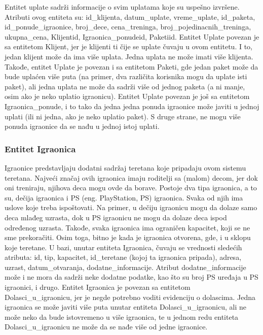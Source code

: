 \documentclass[../main.tex]{subfiles}
\begin{document}
Entitet uplate sadrži informacije o svim uplatama koje su uspešno izvršene. Atributi ovog entiteta su: id\_klijenta, datum\_uplate, vreme\_uplate, id\_paketa, id\_ponude\_igraonice, broj\_dece, cena\_treninga, broj\_pojedinacnih\_treninga, ukupna\_cena, Klijentid, Igraonica\_ponudeid, Paketiid.
Entitet Uplate povezan je sa entitetom Klijent, jer je klijenti ti čije se uplate čuvaju u ovom entitetu. I to, jedan klijent može da ima više uplata. Jedna uplata ne može imati više klijenta. Takođe, entitet Uplate je povezan i sa entitetom Paketi, gde jedan paket može da bude uplaćen više puta (na primer, dva različita korisnika mogu da uplate isti paket), ali jedna uplata ne može da sadrži više od jednog paketa (a ni manje, osim ako je neko uplatio igraonicu). Entitet Uplate povezan je još sa entitetom Igraonica\_ponude, i to tako da jedna jedna ponuda igraonice može javiti u jednoj uplati (ili ni jedna, ako je neko uplatio paket). S druge strane, ne mogu više ponuda igraonice da se nađu u jednoj istoj uplati.


\subsubsection{Entitet Igraonica}
Igraonice predstavljaju dodatni sadržaj teretana koje pripadaju ovom sistemu teretana. Najveći značaj ovih igraonica imaju roditelji sa (malom) decom, jer dok oni treniraju, njihova deca mogu ovde da borave. Postoje dva tipa igraonica, a to su, dečija igraonica i PS (eng. PlayStation, PS) igraonica. Svaka od njih ima uslove koje treba ispoštovati. Na primer, u dečiju igraonicu mogu da dolaze samo deca mlađeg uzrasta, dok u PS igraonicu ne mogu da dolaze deca ispod određenog uzrasta. Takođe, svaka igraonica ima ograničen kapacitet, koji se ne sme prekoračiti. Osim toga, bitno je kada je igraonica otvorena, gde, i u sklopu koje teretane.
U bazi, unutar entiteta Igraonica, čuvaju se vrednosti sledećih atributa: id, tip, kapacitet, id\_teretane (kojoj ta igraonica pripada), adresa, uzrast, datum\_otvaranja, dodatne\_informacije. Atribut dodatne\_informacije može i ne mora da sadrži neke dodatne podatke, kao što su broj PS uređaja u PS igraonici, i drugo. Entitet Igraonica je povezan sa entitetom Dolasci\_u\_igraonicu, jer je negde potrebno voditi evidenciju o dolascima. Jedna igraonica se može javiti više puta unutar entiteta Dolasci\_u\_igraonicu, ali ne može neko da bude istovremeno u više igraonica, te u jednom redu entiteta Dolasci\_u\_igraonicu ne može da se nađe više od jedne igraonice.
\end{document}
